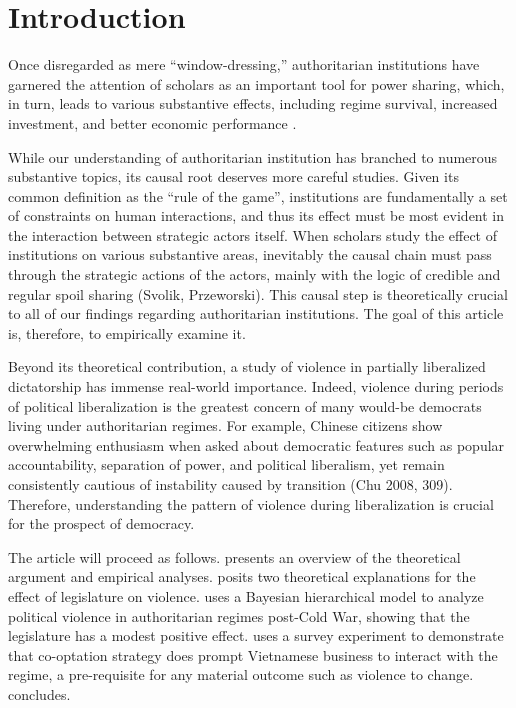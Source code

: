 \section{Introduction}
\label{sec:introduction}

Once disregarded as mere ``window-dressing,'' authoritarian institutions have garnered the attention of scholars as an important tool for power sharing, which, in turn, leads to various substantive effects, including regime survival, increased investment, and better economic performance \citep{Gandhi2008}.

While our understanding of authoritarian institution has branched to numerous substantive topics, its causal root deserves more careful studies. Given its common definition as the ``rule of the game'', institutions are fundamentally a set of constraints on human interactions, and thus its effect must be most evident in the interaction between strategic actors itself.  When scholars study the effect of institutions on various substantive areas, inevitably the causal chain must pass through the strategic actions of the actors, mainly with the logic of credible and regular spoil sharing (Svolik, Przeworski). This causal step is theoretically crucial to all of our findings regarding authoritarian institutions. The goal of this article is, therefore, to empirically examine it.

Beyond its theoretical contribution, a study of violence in partially liberalized dictatorship has immense real-world importance. Indeed, violence during periods of political liberalization is the greatest concern of many would-be democrats living under authoritarian regimes. For example, Chinese citizens show overwhelming enthusiasm when asked about democratic features such as popular accountability, separation of power, and political liberalism, yet remain consistently cautious of instability caused by transition (Chu 2008, 309). Therefore, understanding the pattern of violence during liberalization is crucial for the prospect of democracy.

The article will proceed as follows.  presents an overview of the theoretical argument and empirical analyses.  posits two theoretical explanations for the effect of legislature on violence.  uses a Bayesian hierarchical model to analyze political violence in authoritarian regimes post-Cold War, showing that the legislature has a modest positive effect.  uses a survey experiment to demonstrate that co-optation strategy does prompt Vietnamese business to interact with the regime, a pre-requisite for any material outcome such as violence to change.  concludes.